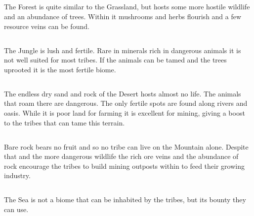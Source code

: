 \subsection{}\label{ch:World:Biomes:Forest}
The \gls*{Forest} is quite similar to the \gls{Grassland}, but hosts some more
hostile wildlife and an abundance of trees. Within it mushrooms and herbs
flourish and a few resource veins can be found.

\subsection{}\label{ch:World:Biomes:Jungle}
The \gls*{Jungle} is lush and fertile. Rare in minerals rich in dangerous
animals it is not well suited for most tribes. If the animals can be tamed and
the trees uprooted it is the most fertile biome.

\subsection{}\label{ch:World:Biomes:Desert}
The endless dry sand and rock of the \gls*{Desert} hosts almost no life. The
animals that roam there are dangerous. The only fertile spots are found along
rivers and oasis. While it is poor land for farming it is excellent for mining,
giving a boost to the tribes that can tame this terrain.

\subsection{}\label{ch:World:Biomes:Mountain}
Bare rock bears no fruit and so no tribe can live on the \gls*{Mountain} alone.
Despite that and the more dangerous wildlife the rich ore veins and the
abundance of rock encourage the tribes to build mining outposts within to feed
their growing industry.

\subsection{}\label{ch:World:Biomes:Sea}
The \gls*{Sea} is not a biome that can be inhabited by the tribes, but its
bounty they can use.
